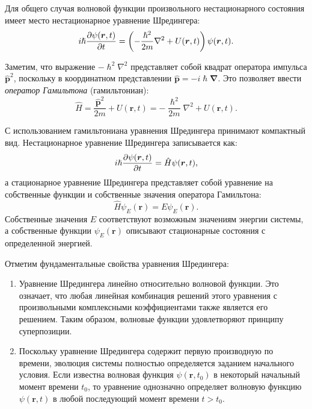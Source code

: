 \documentclass[a4paper, 12pt]{article}
\begin{document}
Для общего случая волновой функции произвольного нестационарного состояния имеет место нестационарное уравнение Шредингера:
\begin{equation}
i\hslash \pdv{\psi(\bm{r}, t)}{t} = \left( -\frac{\hslash^2}{2m} \nabla^2 + U(\bm{r}, t) \right) \psi(\bm{r}, t).
\end{equation}

Заметим, что выражение $-\hslash^2\nabla^2$ представляет собой квадрат оператора импульса $\hat{\bm{p}}^2$, поскольку в координатном представлении $\hat{\bm{p}} = -i\hslash\bm{\nabla}$. Это позволяет ввести \emph{оператор Гамильтона} (гамильтониан):
\begin{equation}
\hat{H} = \frac{\hat{\bm{p}}^2}{2m} + U(\bm{r}, t) = -\frac{\hslash^2}{2m} \nabla^2 + U(\bm{r}, t).
\end{equation}

С использованием гамильтониана уравнения Шредингера принимают компактный вид. Нестационарное уравнение Шредингера записывается как:
\begin{equation}
i\hslash \pdv{\psi(\bm{r}, t)}{t} = \hat{H} \psi(\bm{r}, t),
\end{equation}
а стационарное уравнение Шредингера представляет собой уравнение на собственные функции и собственные значения оператора Гамильтона:
\begin{equation}
\hat{H} \psi_E(\bm{r}) = E \psi_E(\bm{r}).
\end{equation}
Собственные значения $E$ соответствуют возможным значениям энергии системы, а собственные функции $\psi_E(\bm{r})$ описывают стационарные состояния с определенной энергией.

Отметим фундаментальные свойства уравнения Шредингера:

\begin{enumerate}
\item Уравнение Шредингера линейно относительно волновой функции. Это означает, что любая линейная комбинация решений этого уравнения с произвольными комплексными коэффициентами также является его решением. Таким образом, волновые функции удовлетворяют принципу суперпозиции.

\item Поскольку уравнение Шредингера содержит первую производную по времени, эволюция системы полностью определяется заданием начального условия. Если известна волновая функция $\psi(\bm{r}, t_0)$ в некоторый начальный момент времени $t_0$, то уравнение однозначно определяет волновую функцию $\psi(\bm{r}, t)$ в любой последующий момент времени $t > t_0$.
\end{enumerate}
\end{document}
